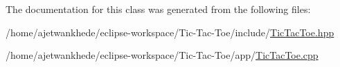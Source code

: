The documentation for this class was generated from the following files\+:\begin{DoxyCompactItemize}
\item 
/home/ajetwankhede/eclipse-\/workspace/\+Tic-\/\+Tac-\/\+Toe/include/\mbox{\hyperlink{TicTacToe_8hpp}{Tic\+Tac\+Toe.\+hpp}}\item 
/home/ajetwankhede/eclipse-\/workspace/\+Tic-\/\+Tac-\/\+Toe/app/\mbox{\hyperlink{TicTacToe_8cpp}{Tic\+Tac\+Toe.\+cpp}}\end{DoxyCompactItemize}

